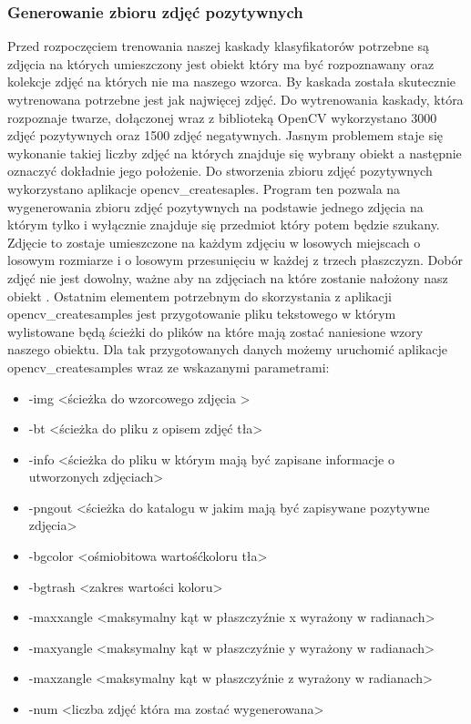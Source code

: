 \subsubsection{Generowanie zbioru zdjęć pozytywnych}\label{sec:generowanieZdjec}
Przed rozpoczęciem trenowania naszej kaskady klasyfikatorów potrzebne są zdjęcia na których umieszczony jest  obiekt który ma być rozpoznawany oraz kolekcje zdjęć na których nie ma naszego wzorca. By kaskada została skutecznie wytrenowana potrzebne jest jak najwięcej zdjęć. Do wytrenowania kaskady, która rozpoznaje twarze, dołączonej wraz z biblioteką OpenCV wykorzystano 3000 zdjęć pozytywnych oraz 1500 zdjęć negatywnych. Jasnym problemem staje się wykonanie takiej liczby zdjęć na których znajduje się wybrany obiekt a następnie oznaczyć dokładnie jego położenie. Do stworzenia zbioru zdjęć pozytywnych wykorzystano aplikacje opencv\_createsaples. Program ten pozwala na wygenerowania zbioru zdjęć pozytywnych na podstawie jednego zdjęcia na którym tylko i wyłącznie znajduje się przedmiot który potem będzie szukany. Zdjęcie to zostaje umieszczone na każdym zdjęciu w losowych miejscach o losowym rozmiarze i o losowym przesunięciu w każdej z trzech płaszczyzn. Dobór zdjęć nie jest dowolny, ważne aby na zdjęciach na które zostanie nałożony nasz obiekt . Ostatnim elementem potrzebnym do skorzystania z aplikacji opencv\_createsamples jest przygotowanie pliku tekstowego w którym wylistowane będą ścieżki do plików na które mają zostać naniesione wzory naszego obiektu. Dla tak przygotowanych danych możemy uruchomić aplikacje opencv\_createsamples wraz ze wskazanymi parametrami:
\begin{itemize}
    \item -img \textless ścieżka do wzorcowego zdjęcia \textgreater
    \item -bt \textless ścieżka do pliku z opisem zdjęć tła\textgreater
    \item -info \textless ścieżka do pliku w którym mają być zapisane informacje o utworzonych zdjęciach\textgreater
    \item -pngout \textless ścieżka do katalogu w jakim mają być zapisywane pozytywne zdjęcia\textgreater
    \item -bgcolor \textless ośmiobitowa wartośćkoloru tła\textgreater
    \item -bgtrash \textless zakres wartości koloru\textgreater
    \item -maxxangle \textless maksymalny kąt w płaszczyźnie x wyrażony w radianach\textgreater
    \item -maxyangle \textless maksymalny kąt w płaszczyźnie y wyrażony w radianach\textgreater
    \item -maxzangle \textless maksymalny kąt w płaszczyźnie z wyrażony w radianach\textgreater
    \item -num \textless liczba zdjęć która ma zostać wygenerowana>

\end{itemize}

